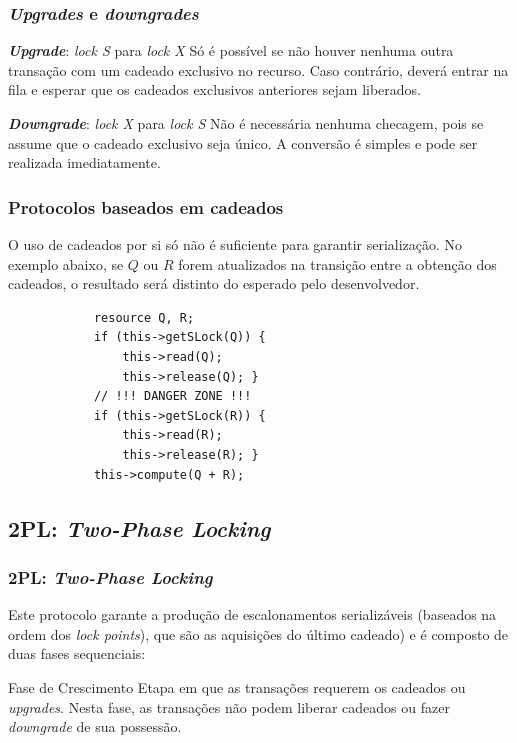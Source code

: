 \documentclass{beamer}
\begin{document}
\begin{frame}
    \frametitle{\emph{Upgrades} e \emph{downgrades}}

    \begin{block}{\textbf{\emph{Upgrade}}: \emph{lock S} para \emph{lock X}}
        Só é possível se não houver nenhuma outra transação com um cadeado exclusivo no recurso. Caso contrário, deverá entrar na fila e esperar que os cadeados exclusivos anteriores sejam liberados.
    \end{block}

    \medskip
    \begin{block}{\textbf{\emph{Downgrade}}: \emph{lock X} para \emph{lock S}}
        Não é necessária nenhuma checagem, pois se assume que o cadeado exclusivo seja único. A conversão é simples e pode ser realizada imediatamente.
    \end{block}

\end{frame}


\begin{frame}[fragile]
    \frametitle{Protocolos baseados em cadeados}

    O uso de cadeados por si só não é suficiente para garantir serialização. No exemplo abaixo, se $Q$ ou $R$ forem atualizados na transição entre a obtenção dos cadeados, o resultado será distinto do esperado pelo desenvolvedor.

    \begin{example}
        \begin{verbatim}
            resource Q, R;
            if (this->getSLock(Q)) {
                this->read(Q);
                this->release(Q); }
            // !!! DANGER ZONE !!!
            if (this->getSLock(R)) {
                this->read(R);
                this->release(R); }
            this->compute(Q + R);
        \end{verbatim}
    \end{example}

\end{frame}


\subsection{2PL: \emph{Two-Phase Locking}}
\begin{frame}
    \frametitle{2PL: \emph{Two-Phase Locking}}

    Este protocolo garante a produção de escalonamentos serializáveis (baseados na ordem dos \emph{lock points}), que são as aquisições do último cadeado) e é composto de duas fases sequenciais:

    \medskip
    \begin{block}{Fase de Crescimento}
        Etapa em que as transações requerem os cadeados ou \emph{upgrades}. Nesta fase, as transações não podem liberar cadeados ou fazer \emph{downgrade} de sua possessão.
    \end{block}
\end{frame}
\end{document}
